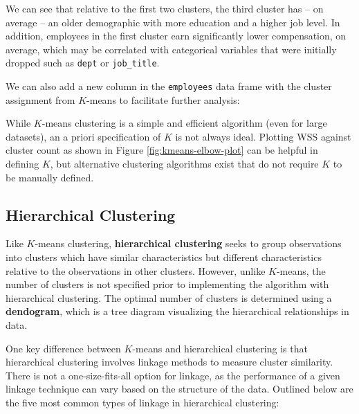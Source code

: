 \documentclass[
]{book}
\newenvironment{Shaded}{\begin{snugshade}}{\end{snugshade}}
\newcommand{\AttributeTok}[1]{\textcolor[rgb]{0.77,0.63,0.00}{#1}}
\newcommand{\CommentTok}[1]{\textcolor[rgb]{0.56,0.35,0.01}{\textit{#1}}}
\newcommand{\FunctionTok}[1]{\textcolor[rgb]{0.00,0.00,0.00}{#1}}
\newcommand{\NormalTok}[1]{#1}
\newcommand{\OtherTok}[1]{\textcolor[rgb]{0.56,0.35,0.01}{#1}}
\newcommand{\SpecialCharTok}[1]{\textcolor[rgb]{0.00,0.00,0.00}{#1}}
\begin{document}
We can see that relative to the first two clusters, the third cluster has -- on average -- an older demographic with more education and a higher job level. In addition, employees in the first cluster earn significantly lower compensation, on average, which may be correlated with categorical variables that were initially dropped such as \texttt{dept} or \texttt{job\_title}.

We can also add a new column in the \texttt{employees} data frame with the cluster assignment from \(K\)-means to facilitate further analysis:

\begin{Shaded}
\end{Shaded}

While \(K\)-means clustering is a simple and efficient algorithm (even for large datasets), an a priori specification of \(K\) is not always ideal. Plotting WSS against cluster count as shown in Figure \ref{fig:kmeans-elbow-plot} can be helpful in defining \(K\), but alternative clustering algorithms exist that do not require \(K\) to be manually defined.

\hypertarget{hierarchical-clustering}{%
\subsection{Hierarchical Clustering}\label{hierarchical-clustering}}

Like \(K\)-means clustering, \textbf{hierarchical clustering} seeks to group observations into clusters which have similar characteristics but different characteristics relative to the observations in other clusters. However, unlike \(K\)-means, the number of clusters is not specified prior to implementing the algorithm with hierarchical clustering. The optimal number of clusters is determined using a \textbf{dendogram}, which is a tree diagram visualizing the hierarchical relationships in data.

One key difference between \(K\)-means and hierarchical clustering is that hierarchical clustering involves linkage methods to measure cluster similarity. There is not a one-size-fits-all option for linkage, as the performance of a given linkage technique can vary based on the structure of the data. Outlined below are the five most common types of linkage in hierarchical clustering:
\end{document}
